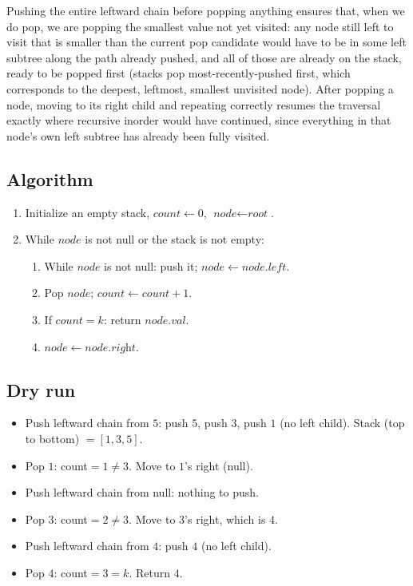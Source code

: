 Pushing the entire leftward chain before popping anything ensures that,
when we do pop, we are popping the smallest value not yet visited: any
node still left to visit that is smaller than the current pop candidate
would have to be in some left subtree along the path already pushed, and
all of those are already on the stack, ready to be popped first (stacks
pop most-recently-pushed first, which corresponds to the deepest,
leftmost, smallest unvisited node). After popping a node, moving to its
right child and repeating correctly resumes the traversal exactly where
recursive inorder would have continued, since everything in that node's
own left subtree has already been fully visited.

\subsection*{Algorithm}

\begin{enumerate}
  \item Initialize an empty stack, $\textit{count} \gets 0$,
        $\textit{node} \gets \textit{root}$.
  \item While $\textit{node}$ is not null or the stack is not empty:
  \begin{enumerate}
    \item While $\textit{node}$ is not null: push it; $\textit{node}
          \gets \textit{node}.\textit{left}$.
    \item Pop $\textit{node}$; $\textit{count} \gets \textit{count}+1$.
    \item If $\textit{count} = k$: return $\textit{node}.\textit{val}$.
    \item $\textit{node} \gets \textit{node}.\textit{right}$.
  \end{enumerate}
\end{enumerate}

\subsection*{Dry run}


\begin{itemize}
  \item Push leftward chain from $5$: push $5$, push $3$, push $1$ (no
        left child). Stack (top to bottom) $=[1,3,5]$.
  \item Pop $1$: count$=1 \ne 3$. Move to $1$'s right (null).
  \item Push leftward chain from null: nothing to push.
  \item Pop $3$: count$=2 \ne 3$. Move to $3$'s right, which is $4$.
  \item Push leftward chain from $4$: push $4$ (no left child).
  \item Pop $4$: count$=3=k$. Return $4$.
\end{itemize}

